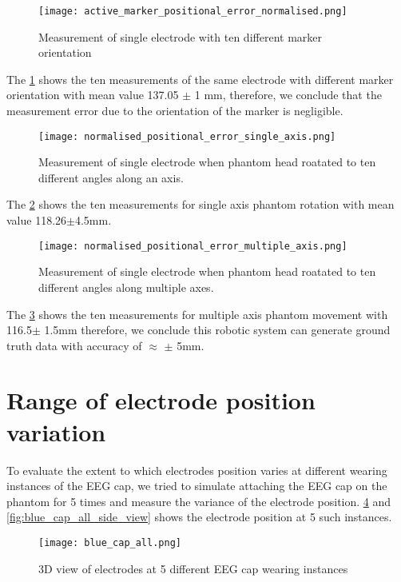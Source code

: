 \begin{figure}[hbt!]
	\centering
	\texttt{[image: active\_marker\_positional\_error\_normalised.png]}
	\caption{Measurement of single electrode with ten different marker orientation} 
	\label{fig:active_marker_normalised_positional_error}
\end{figure}

The \cref{fig:active_marker_normalised_positional_error} shows the ten measurements of the same electrode with different marker orientation with mean value 137.05 $\pm$ 1 mm, therefore, we conclude that the measurement error due to the orientation of the marker is negligible.  

\begin{figure}[hbt!]
	\centering
	\texttt{[image: normalised\_positional\_error\_single\_axis.png]}
	\caption{Measurement of single electrode when phantom head roatated to ten different angles along an axis.} 
	\label{fig:Normalised_positional_error_single_axis}
\end{figure}

The \cref{fig:Normalised_positional_error_single_axis} shows the ten measurements for single axis phantom rotation with mean value 118.26$\pm$4.5mm. 

\begin{figure}[hbt!]
	\centering
	\texttt{[image: normalised\_positional\_error\_multiple\_axis.png]}
	\caption{Measurement of single electrode when phantom head roatated to ten different angles along multiple axes.}  
	\label{fig:Normalised_positional_error_multiple_axis}
\end{figure}

The \cref{fig:Normalised_positional_error_multiple_axis} shows the ten measurements for multiple axis phantom movement with 116.5$\pm$ 1.5mm therefore, we conclude this robotic system can generate ground truth data with accuracy of $\approx$ $\pm$ 5mm.

\hfill
\newpage
\section{Range of electrode position variation}
To evaluate the extent to which electrodes position varies at different wearing instances of the EEG cap, we tried to simulate attaching the EEG cap on the phantom for 5 times and measure the variance of the electrode position. \cref{fig:blue_cap_all} and \cref{fig:blue_cap_all_side_view} shows the electrode position at 5 such instances.
\begin{figure}[hbt!]
	\centering
	\texttt{[image: blue\_cap\_all.png]}
	\caption{3D view of electrodes at 5 different EEG cap wearing instances} 
	\label{fig:blue_cap_all}
\end{figure}

